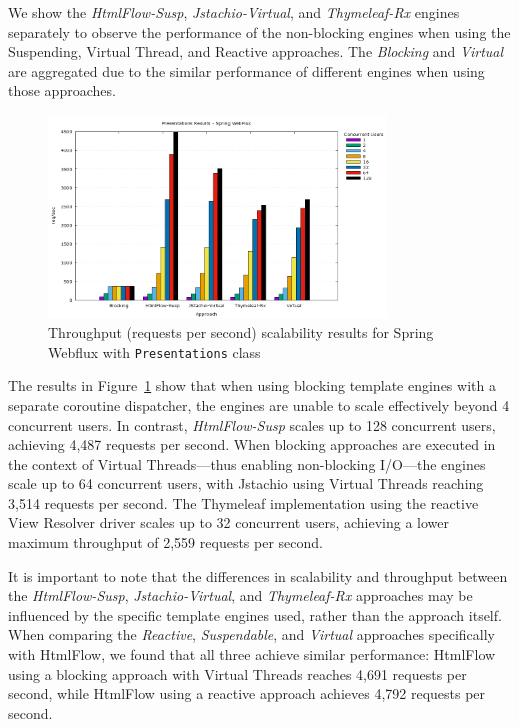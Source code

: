 We show the \textit{HtmlFlow-Susp}, \textit{Jstachio-Virtual}, and
\textit{Thymeleaf-Rx} engines separately to observe the performance of the
non-blocking engines when using the Suspending, Virtual Thread, and Reactive
approaches. The \textit{Blocking} and \textit{Virtual} are aggregated due to
the similar performance of different engines when using those approaches.

\begin{figure}[h]
     \centering
     \includegraphics[width=0.8\textwidth]{./Graphs/presentations-webflux-jmeter.png}
     \caption{Throughput (requests per second) scalability results for Spring Webflux with \texttt{Presentations} class}\label{fig:presentations-webflux-jmeter}
\end{figure}

The results in Figure~\ref{fig:presentations-webflux-jmeter} show that when
using blocking template engines with a separate coroutine dispatcher, the
engines are unable to scale effectively beyond 4 concurrent users. In contrast,
\textit{HtmlFlow-Susp} scales up to 128 concurrent users, achieving 4,487
requests per second. When blocking approaches are executed in the context of
Virtual Threads—thus enabling non-blocking I/O—the engines scale up to 64
concurrent users, with Jstachio using Virtual Threads reaching 3,514 requests
per second. The Thymeleaf implementation using the reactive View Resolver
driver scales up to 32 concurrent users, achieving a lower maximum throughput
of 2,559 requests per second.

It is important to note that the differences in scalability and throughput
between the \textit{HtmlFlow-Susp}, \textit{Jstachio-Virtual}, and
\textit{Thymeleaf-Rx} approaches may be influenced by the specific template
engines used, rather than the approach itself. When comparing the
\textit{Reactive}, \textit{Suspendable}, and \textit{Virtual} approaches
specifically with HtmlFlow, we found that all three achieve similar
performance: HtmlFlow using a blocking approach with Virtual Threads reaches
4,691 requests per second, while HtmlFlow using a reactive approach achieves
4,792 requests per second.

